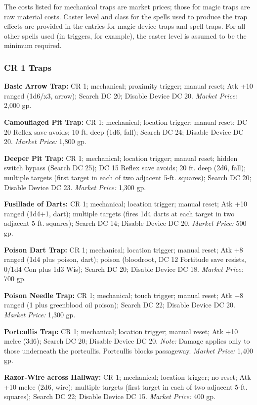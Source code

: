 The costs listed for mechanical traps are market prices; those for magic traps 
are raw material costs. Caster level and class for the spells used to produce the 
trap effects are provided in the entries for magic device traps and spell traps. 
For all other spells used (in triggers, for example), the caster level is assumed 
to be the minimum required.

\subsubsection{CR 1 Traps}

\textbf{Basic Arrow Trap:} CR 1; mechanical; proximity trigger; manual reset; Atk 
+10 ranged (1d6/x3, arrow); Search DC 20; Disable Device DC 20. \textit{Market 
Price:} 2,000 gp.

\textbf{Camouflaged Pit Trap:} CR 1; mechanical; location trigger; manual reset; 
DC 20 Reflex save avoids; 10 ft. deep (1d6, fall); Search DC 24; Disable Device 
DC 20. \textit{Market Price:} 1,800 gp.

\textbf{Deeper Pit Trap:} CR 1; mechanical; location trigger; manual reset; hidden 
switch bypass (Search DC 25); DC 15 Reflex save avoids; 20 ft. deep (2d6, fall); 
multiple targets (first target in each of two adjacent 5-ft. squares); Search DC 
20; Disable Device DC 23. \textit{Market Price:} 1,300 gp.

\textbf{Fusillade of Darts:} CR 1; mechanical; location trigger; manual reset; 
Atk +10 ranged (1d4+1, dart); multiple targets (fires 1d4 darts at each target 
in two adjacent 5-ft. squares); Search DC 14; Disable Device DC 20. \textit{Market 
Price:} 500 gp.

\textbf{Poison Dart Trap:} CR 1; mechanical; location trigger; manual reset; Atk 
+8 ranged (1d4 plus poison, dart); poison (bloodroot, DC 12 Fortitude save resists, 
0/1d4 Con plus 1d3 Wis); Search DC 20; Disable Device DC 18. \textit{Market Price: 
}700 gp.

\textbf{Poison Needle Trap:} CR 1; mechanical; touch trigger; manual reset; Atk 
+8 ranged (1 plus greenblood oil poison); Search DC 22; Disable Device DC 20. \textit{Market 
Price:} 1,300 gp.

\textbf{Portcullis Trap:} CR 1; mechanical; location trigger; manual reset; Atk 
+10 melee (3d6); Search DC 20; Disable Device DC 20. \textit{Note:} Damage applies 
only to those underneath the portcullis. Portcullis blocks passageway. \textit{Market 
Price:} 1,400 gp.

\textbf{Razor-Wire across Hallway:} CR 1; mechanical; location trigger; no reset; 
Atk +10 melee (2d6, wire); multiple targets (first target in each of two adjacent 
5-ft. squares); Search DC 22; Disable Device DC 15. \textit{Market Price:} 400 
gp.

